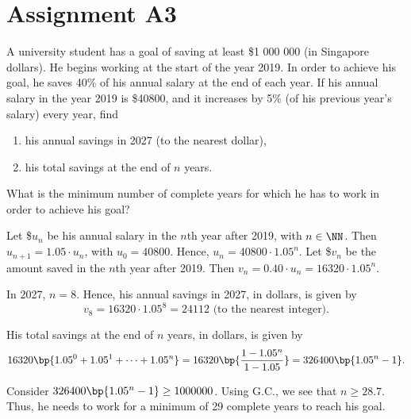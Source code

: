 \section{Assignment A3}

\begin{problem}
    A university student has a goal of saving at least \$1 000 000 (in Singapore dollars). He begins working at the start of the year 2019. In order to achieve his goal, he saves 40\% of his annual salary at the end of each year. If his annual salary in the year 2019 is \$40800, and it increases by 5\% (of his previous year's salary) every year, find

    \begin{enumerate}
        \item his annual savings in 2027 (to the nearest dollar),
        \item his total savings at the end of $n$ years.
    \end{enumerate}

        What is the minimum number of complete years for which he has to work in order to achieve his goal?
\end{problem}
\begin{solution}
    Let \$$u_n$ be his annual salary in the $n$th year after 2019, with $n \in \NN$. Then $u_{n+1} = 1.05\cdot u_n$, with $u_0 = 40800$. Hence, $u_n = 40800 \cdot 1.05^n$. Let \$$v_n$ be the amount saved in the $n$th year after 2019. Then $v_n = 0.40 \cdot u_n = 16320 \cdot 1.05^n$.

    \begin{ppart}
        In 2027, $n = 8$. Hence, his annual savings in 2027, in dollars, is given by \[v_8 = 16320 \cdot 1.05^8 = 24112 \text{ (to the nearest integer)}.\]
    \end{ppart}
    \begin{ppart}
        His total savings at the end of $n$ years, in dollars, is given by \[16320\bp{1.05^0 + 1.05^1 + \cdots + 1.05^n} = 16320 \bp{\frac{1 - 1.05^n}{1-1.05}} = 326400 \bp{1.05^n - 1}.\]
    \end{ppart}

    Consider $326400 \bp{1.05^n - 1} \geq 1 000 000$. Using G.C., we see that $n \geq 28.7$. Thus, he needs to work for a minimum of 29 complete years to reach his goal.
\end{solution}

